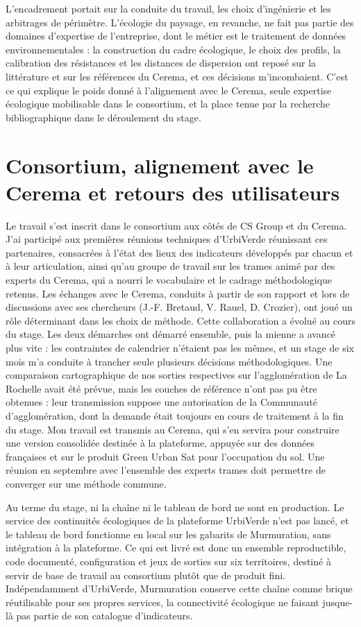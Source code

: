 \documentclass[a4paper,12pt]{report}
\begin{document}
L'encadrement portait sur la conduite du travail, les choix d'ingénierie et les arbitrages de périmètre. L'écologie du paysage, en revanche, ne fait pas partie des domaines d'expertise de l'entreprise, dont le métier est le traitement de données environnementales : la construction du cadre écologique, le choix des profils, la calibration des résistances et les distances de dispersion ont reposé sur la littérature et sur les références du Cerema, et ces décisions m'incombaient. C'est ce qui explique le poids donné à l'alignement avec le Cerema, seule expertise écologique mobilisable dans le consortium, et la place tenue par la recherche bibliographique dans le déroulement du stage.

\section{Consortium, alignement avec le Cerema et retours des utilisateurs}
Le travail s'est inscrit dans le consortium aux côtés de CS Group et du Cerema. J'ai participé aux premières réunions techniques d'UrbiVerde réunissant ces partenaires, consacrées à l'état des lieux des indicateurs développés par chacun et à leur articulation, ainsi qu'au groupe de travail sur les trames animé par des experts du Cerema, qui a nourri le vocabulaire et le cadrage méthodologique retenus. Les échanges avec le Cerema, conduits à partir de son rapport et lors de discussions avec ses chercheurs (J.-F. Bretaud, V. Rauel, D. Crozier), ont joué un rôle déterminant dans les choix de méthode. Cette collaboration a évolué au cours du stage. Les deux démarches ont démarré ensemble, puis la mienne a avancé plus vite : les contraintes de calendrier n'étaient pas les mêmes, et un stage de six mois m'a conduite à trancher seule plusieurs décisions méthodologiques. Une comparaison cartographique de nos sorties respectives sur l'agglomération de La Rochelle avait été prévue, mais les couches de référence n'ont pas pu être obtenues : leur transmission suppose une autorisation de la Communauté d'agglomération, dont la demande était toujours en cours de traitement à la fin du stage. Mon travail est transmis au Cerema, qui s'en servira pour construire une version consolidée destinée à la plateforme, appuyée sur des données françaises et sur le produit Green Urban Sat pour l'occupation du sol. Une réunion en septembre avec l'ensemble des experts trames doit permettre de converger sur une méthode commune.

Au terme du stage, ni la chaîne ni le tableau de bord ne sont en production. Le service des continuités écologiques de la plateforme UrbiVerde n'est pas lancé, et le tableau de bord fonctionne en local sur les gabarits de Murmuration, sans intégration à la plateforme. Ce qui est livré est donc un ensemble reproductible, code documenté, configuration et jeux de sorties sur six territoires, destiné à servir de base de travail au consortium plutôt que de produit fini. Indépendamment d'UrbiVerde, Murmuration conserve cette chaîne comme brique réutilisable pour ses propres services, la connectivité écologique ne faisant jusque-là pas partie de son catalogue d'indicateurs.
 
\end{document}
